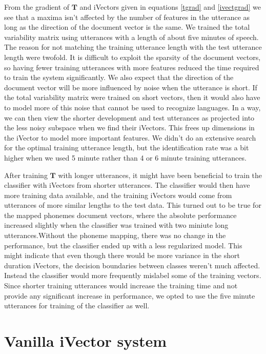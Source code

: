 From the gradient of $\mathbf{T}$ and iVectors given in equations \ref{tgrad} and \ref{ivectgrad} we see that a maxima isn't affected by the number of features in the utterance as long as the direction of the document vector is the same. We trained the total variability matrix using utterances with a length of about five minutes of speech. The reason for not matching the training utterance length with the test utterance length were twofold. It is difficult to exploit the sparsity of the document vectors, so having fewer training utterances with more features reduced the time required to train the system significantly. We also expect that the direction of the document vector will be more influenced by noise when the utterance is short. If the total variability matrix were trained on short vectors, then it would also have to model more of this noise that cannot be used to recognize languages. In a way, we can then view the shorter development and test utterances as projected into the less noisy subspace when we find their iVectors. This frees up dimensions in the iVector to model more important features. We didn't do an extensive search for the optimal training utterance length, but the identification rate was a bit higher when we used 5 minute rather than 4 or 6 minute training utterances.

After training $\mathbf{T}$ with longer utterances, it might have been beneficial to train the classifier with iVectors from shorter utterances. The classifier would then have more training data available, and the training iVectors would come from utterances of more similar lengths to the test data. This turned out to be true for the mapped phonemes document vectors, where the absolute performance increased slightly when the classifier was trained with two miniute long utterances.Without the phoneme mapping, there was no change in the performance, but the classifier ended up with a less regularized model. This might indicate that even though there would be more variance in the short duration iVectors, the decision boundaries between classes weren't much affected. Instead the classifier would more frequently mislabel some of the training vectors. Since shorter training utterances would increase the training time and not provide any significant increase in performance, we opted to use the five minute utterances for training of the classifier as well.


\section{Vanilla iVector system}
\label{sect:vanillaivect}

